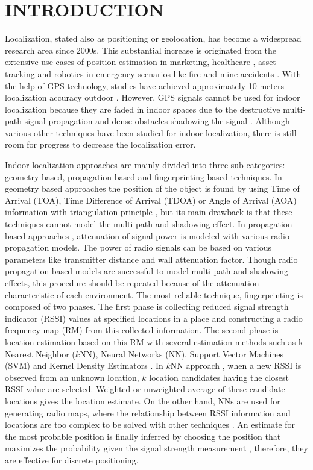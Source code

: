 \documentclass[conference]{IEEEtran}
\begin{document}
{	\section{INTRODUCTION}
	\label{sec:intro}
	Localization, stated also as positioning or geolocation, has become a widespread research area since 2000s. This substantial increase is originated from the extensive use cases of position estimation in marketing, healthcare \cite{Cal2015}, asset tracking and robotics in emergency scenarios like fire and mine accidents \cite{Zha2009}. With the help of GPS technology, studies have achieved approximately 10 meters localization accuracy outdoor \cite{Dju2001}. However, GPS signals cannot be used for indoor localization because they are faded in indoor spaces due to the destructive multi-path signal propagation and dense obstacles shadowing the signal \cite{bah2000,Bat2002}. Although various other techniques have been studied for indoor localization, there is still room for progress to decrease the localization error. 
	
	Indoor localization approaches are mainly divided into three sub categories: geometry-based, propagation-based and fingerprinting-based techniques. In geometry based approaches the position of the object is found by using Time of Arrival (TOA), Time Difference of Arrival (TDOA) or Angle of Arrival (AOA) information with triangulation principle \cite{Fan1990,Pet1998}, but its main drawback is that these techniques cannot model the multi-path and shadowing effect. In propagation based approaches \cite{bah2000}, attenuation of signal power is modeled with various radio propagation models. The power of radio signals can be based on various parameters like transmitter distance and wall attenuation factor. Though radio propagation based models are successful to model multi-path and shadowing effects, this procedure should be repeated because of the attenuation characteristic of each environment. The most reliable technique, fingerprinting is composed of two phases. The first phase is collecting reduced signal strength indicator (RSSI) values at specified locations in a place and constructing a radio frequency map (RM) from this collected information. The second phase is location estimation based on this RM with several estimation methods such as k-Nearest Neighbor ($k$NN), Neural Networks (NN), Support Vector Machines (SVM) and Kernel Density Estimators \cite{Roo2002}. In $k$NN approach \cite{bah2000,Big2017}, when a new RSSI is observed from an unknown location, $k$ location candidates having the closest RSSI value are selected. Weighted or unweighted average of these candidate locations gives the location estimate. On the other hand, NNs are used for generating radio maps, where the relationship between RSSI information and locations are too complex to be solved with other techniques \cite{Lyu2011,Maz2015,Sol2016,Zho2017}. An estimate for the most probable position is finally inferred by choosing the position that maximizes the probability given the signal strength measurement \cite{Fas2016}, therefore, they are effective for discrete positioning. 
	
}
\end{document}
